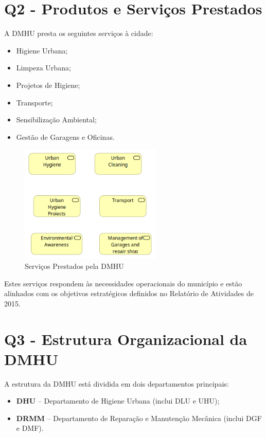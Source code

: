 \documentclass[12pt,a4paper,final]{article}
\begin{document}
    \section*{Q2 - Produtos e Serviços Prestados}\label{sec:produtos-e-servicos-prestados}
    A DMHU presta os seguintes serviços à cidade:
    \begin{itemize}
        \item Higiene Urbana;
        \item Limpeza Urbana;
        \item Projetos de Higiene;
        \item Transporte;
        \item Sensibilização Ambiental;
        \item Gestão de Garagens e Oficinas.
    \end{itemize}

    \begin{figure}[h!]
        \centering
        \includegraphics[width=0.6\textwidth]{Q2 - Business Services}
        \caption{Serviços Prestados pela DMHU}
        \label{fig:2}
    \end{figure}

    Estes serviços respondem às necessidades operacionais do município e estão alinhados com os objetivos estratégicos definidos no Relatório de Atividades de 2015.



    \section*{Q3 - Estrutura Organizacional da DMHU}\label{sec:estrutura-organizacional-da-dmhu}
    A estrutura da DMHU está dividida em dois departamentos principais:
    \begin{itemize}
        \item \textbf{DHU} – Departamento de Higiene Urbana (inclui DLU e UHU);
        \item \textbf{DRMM} – Departamento de Reparação e Manutenção Mecânica (inclui DGF e DMF).
    \end{itemize}
\end{document}
